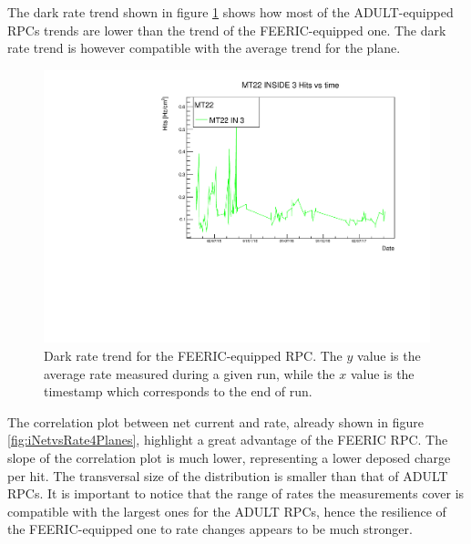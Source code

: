 The dark rate trend shown in figure \ref{fig:FEERICDarkRate} shows how most of the ADULT-equipped RPCs trends are lower than the trend of the FEERIC-equipped one.
The dark rate trend is however compatible with the average trend for the plane.

\begin{figure}[!t]
\begin{center}
\includegraphics[width=0.7\linewidth]{Chapters/Performance/Figs/DarkRateFEERIC.pdf}
\caption{Dark rate trend for the FEERIC-equipped RPC. The $y$ value is the average rate measured during a given run, while the $x$ value is the timestamp which corresponds to the end of run.}
\label{fig:FEERICDarkRate}
\end{center}
\end{figure}

The correlation plot between net current and rate, already shown in figure \ref{fig:iNetvsRate4Planes}, highlight a great advantage of the FEERIC RPC.
The slope of the correlation plot is much lower, representing a lower deposed charge per hit.
The transversal size of the distribution is smaller than that of ADULT RPCs.
It is important to notice that the range of rates the measurements cover is compatible with the largest ones for the ADULT RPCs, hence the resilience of the FEERIC-equipped one to rate changes appears to be much stronger.






